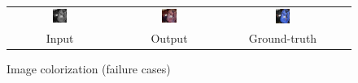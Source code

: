 \documentclass[10pt,twocolumn,letterpaper]{article}
\def\acollumsize{0.14\textwidth}
\begin{document}
\begin{figure}[t!]
\begin{center}
\begin{tabular}{ cccc }
\includegraphics[width=\acollumsize]{img/result/28_in.JPEG}&
\includegraphics[width=\acollumsize]{img/result/28.png}&
\includegraphics[width=\acollumsize]{img/result/28_gt.JPEG}& \\

Input & Output & Ground-truth \\

\end{tabular}
\vspace{-2mm}
\caption{\small Image colorization (failure cases)}
\label{fig:result_failure}
\end{center}
\end{figure}

{\small


}
\end{document}
